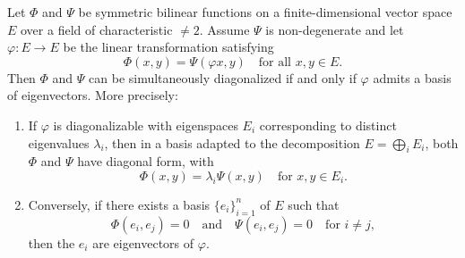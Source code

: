 Let $\Phi$ and $\Psi$ be symmetric bilinear functions on a finite-dimensional vector space $E$ over a field of characteristic $\neq 2$. Assume $\Psi$ is non-degenerate and let $\varphi: E \to E$ be the linear transformation satisfying
$$\Phi(x, y) = \Psi(\varphi x, y) \quad \text{for all } x, y \in E.$$
Then $\Phi$ and $\Psi$ can be simultaneously diagonalized if and only if $\varphi$ admits a basis of eigenvectors. More precisely:
\begin{enumerate}
\item If $\varphi$ is diagonalizable with eigenspaces $E_i$ corresponding to distinct eigenvalues $\lambda_i$, then in a basis adapted to the decomposition $E = \bigoplus_i E_i$, both $\Phi$ and $\Psi$ have diagonal form, with
$$\Phi(x, y) = \lambda_i \Psi(x, y) \quad \text{for } x, y \in E_i.$$
\item Conversely, if there exists a basis $\{e_i\}_{i=1}^n$ of $E$ such that
$$\Phi(e_i, e_j) = 0 \quad \text{and} \quad \Psi(e_i, e_j) = 0 \quad \text{for } i \neq j,$$
then the $e_i$ are eigenvectors of $\varphi$.
\end{enumerate}
